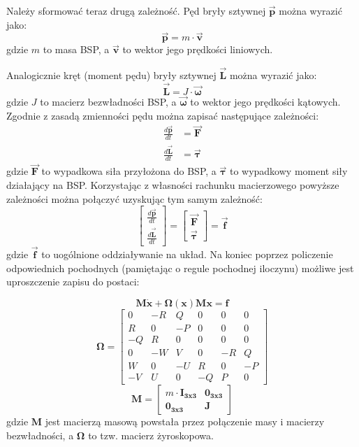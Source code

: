 Należy sformować teraz drugą zależność. Pęd bryły sztywnej $\bm{\vec{p}}$ można wyrazić jako:
\[
	\bm{\vec{p}} = m \cdot \bm{\vec{v}}
\]
gdzie $m$ to masa BSP, a $\bm{\vec{v}}$ to wektor jego prędkości liniowych.

Analogicznie kręt (moment pędu) bryły sztywnej $\bm{\vec{L}}$ można wyrazić jako:
\[
	\bm{\vec{L}} = J \cdot \bm{\vec{\omega}}
\]
gdzie $J$ to macierz bezwładności BSP, a $\bm{\vec{\omega}}$ to wektor jego prędkości kątowych. Zgodnie z zasadą zmienności pędu można zapisać następujące zależności:
\[
	\begin{aligned}
	\frac{d\bm{\vec{p}}}{dt} & = \bm{\vec{F}}\\
	\frac{d\bm{\vec{L}}}{dt} & = \bm{\vec{\tau}}
	\end{aligned}
\]
gdzie $\bm{\vec{F}}$ to wypadkowa siła przyłożona do BSP, a $\bm{\vec{\tau}}$ to wypadkowy moment siły działający na BSP. Korzystając z własności rachunku macierzowego powyższe zależności można połączyć uzyskując tym samym zależność:
\[
              \begin{bmatrix}\frac{d\bm{\vec{p}}}{dt}\\ \frac{d\bm{\vec{L}}}{dt} \end{bmatrix} = \begin{bmatrix}\bm{\vec{F}}\\ \bm{\vec{\tau}} \end{bmatrix} = \bm{\vec{f}}
\]
gdzie $\bm{\vec{f}}$ to uogólnione oddziaływanie na układ. Na koniec poprzez policzenie odpowiednich pochodnych (pamiętając o regule pochodnej iloczynu) możliwe jest uproszczenie zapisu do postaci:

\[
	\bm{M} \bm{\dot{x}} +  \bm{\Omega} \left( \bm{x} \right) \bm{M} \bm{x} = \bm{f}
\]
\[
	\bm{\Omega} = \begin{bmatrix}
	0 & -R & Q & 0 & 0 & 0 \\
	R & 0 & -P & 0 & 0 & 0 \\
	-Q & R & 0 & 0 & 0 & 0 \\
	0 & -W & V & 0 & -R & Q \\
	W & 0 & -U & R & 0 & -P \\
	-V & U & 0 & -Q & P & 0 
	\end{bmatrix}
\]
\[
	\bm{M} = \begin{bmatrix}
	m\cdot \bm{ I_{3x3}} & \bm{0_{3x3}} \\ \bm{0_{3x3}} & \bm{J}
	\end{bmatrix}
\]
gdzie $\bm{M}$ jest macierzą masową powstała przez połączenie masy i macierzy bezwładności, a $\bm{\Omega}$ to tzw. macierz żyroskopowa.\\


